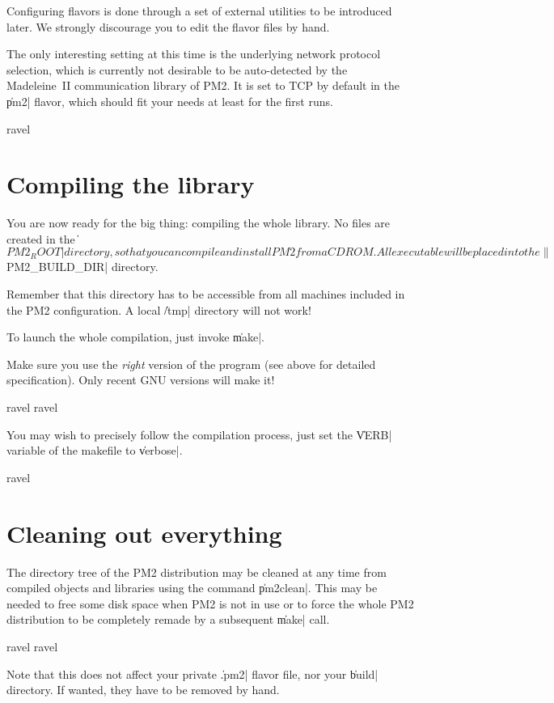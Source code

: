 Configuring flavors is done through a set of external utilities to be
introduced later. We strongly discourage you to edit the flavor files
by hand.

The only interesting setting at this time is the underlying network
protocol selection, which is currently not desirable to be
auto-detected by the Madeleine~II communication library of PM2.  It is
set to TCP by default in the \|pm2| flavor, which should fit your
needs at least for the first runs. 
\begin{shell}
ravel%
\end{shell}

\section{Compiling the library}

You are now ready for the big thing: compiling the whole library.  No
files are created in the \|${PM2_ROOT}| directory, so that you can
compile and install PM2 from a CDROM. All executable will be placed
into the \|${PM2_BUILD_DIR}| directory. 

\begin{warning}
Remember that this directory
has to be accessible from all machines included in the PM2
configuration. A local \|/tmp| directory will not work!
\end{warning}

To launch the whole compilation, just invoke \|make|. 

\begin{warning}
Make sure you
use the \emph{right} version of the program (see above for detailed
specification). Only recent GNU versions will make it!
\end{warning}

\begin{shell}
ravel%
ravel%
\end{shell}
You may wish to precisely follow the compilation process, just set the
\|VERB| variable of the makefile to \|verbose|.
\begin{shell}
ravel%
\end{shell}

\section{Cleaning out everything}

The directory tree of the PM2 distribution may be cleaned at any time
from compiled objects and libraries using the command \|pm2clean|.
This may be needed to free some disk space when PM2 is not in use or
to force the whole PM2 distribution to be completely remade by a
subsequent \|make| call.
\begin{shell}
ravel%
ravel%
\end{shell}
Note that this does not affect your private \|.pm2| flavor file, nor
your \|build| directory. If wanted, they have to be removed by hand.

